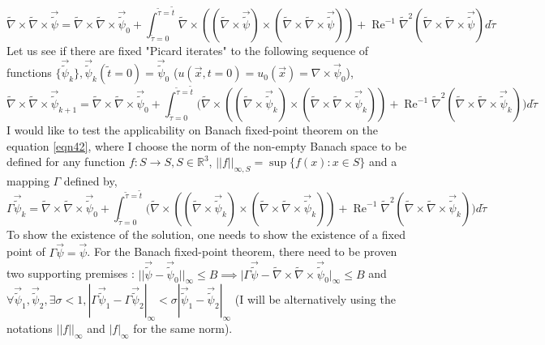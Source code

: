 \documentclass{article}
\begin{document}
\begin{equation*}
\tilde{\nabla}\times\tilde{\nabla}\times\vec{\tilde{\psi}} = \tilde{\nabla}\times\tilde{\nabla}\times\vec{\tilde{\psi}}_0 + \int_{\tilde{\tau} = 0}^{\tilde{\tau} = \tilde{t}} \tilde{\nabla} \times ((\tilde{\nabla} \times \vec{\tilde{\psi}})\times(\tilde{\nabla} \times \tilde{\nabla} \times \vec{\tilde{\psi}})) + \operatorname{Re}^{-1} \tilde{\nabla}^2(\tilde{\nabla}\times\tilde{\nabla}\times\vec{\tilde{\psi}}) d\tilde{\tau}
\end{equation*}
Let us see if there are fixed "Picard iterates" to the following sequence of functions $\{\vec{\tilde{\psi}}_k\}, \vec{\tilde{\psi}}_k(\tilde{t} = 0) = \vec{\tilde{\psi}}_0$ ($u(\vec{x},t=0) = u_0(\vec{x}) = \nabla \times \vec{\psi}_0$),
\begin{equation} \label{eqn42}
\tilde{\nabla}\times\tilde{\nabla}\times\vec{\tilde{\psi}}_{k+1} = \tilde{\nabla}\times\tilde{\nabla}\times\vec{\tilde{\psi}}_0 + \int_{\tilde{\tau} = 0}^{\tilde{\tau} = \tilde{t}} \bigg(\tilde{\nabla} \times ((\tilde{\nabla} \times \vec{\tilde{\psi}}_k)\times(\tilde{\nabla} \times \tilde{\nabla} \times \vec{\tilde{\psi}}_k)) + \operatorname{Re}^{-1} \tilde{\nabla}^2(\tilde{\nabla}\times\tilde{\nabla}\times\vec{\tilde{\psi}}_k) \bigg)d\tilde{\tau}
\end{equation}
I would like to test the applicability on Banach fixed-point theorem on the equation \ref{eqn42}, where I choose the norm of the non-empty Banach space to be defined for any function $f : S \to S, S \in \mathbb{R}^3$, $||f||_{\infty, S} = \sup\{f(x): x \in S\}$ and a mapping $\Gamma$ defined by,
\begin{equation*}
\Gamma \vec{\tilde{\psi}}_{k} = \tilde{\nabla}\times\tilde{\nabla}\times\vec{\tilde{\psi}}_0 + \int_{\tilde{\tau} = 0}^{\tilde{\tau} = \tilde{t}} \bigg(\tilde{\nabla} \times ((\tilde{\nabla} \times \vec{\tilde{\psi}}_k)\times(\tilde{\nabla} \times \tilde{\nabla} \times \vec{\tilde{\psi}}_k)) + \operatorname{Re}^{-1} \tilde{\nabla}^2(\tilde{\nabla}\times\tilde{\nabla}\times\vec{\tilde{\psi}}_k) \bigg)d\tilde{\tau}
\end{equation*}
To show the existence of the solution, one needs to show the existence of a fixed point of $\Gamma \vec{\psi} = \vec{\psi}$. For the Banach fixed-point theorem, there need to be proven two supporting premises : $||\vec{\tilde{\psi}}-\vec{\tilde{\psi}}_0||_{\infty}\le B \implies \bigg|\Gamma \vec{\tilde{\psi}} - \tilde{\nabla}\times\tilde{\nabla}\times\vec{\tilde{\psi}}_0\bigg|_{\infty}\le B$ and $\forall \vec{\tilde{\psi}}_1, \vec{\tilde{\psi}}_2, \exists \sigma < 1, |\Gamma\vec{\tilde{\psi}}_1 - \Gamma\vec{\tilde{\psi}}_2|_{\infty} < \sigma |\vec{\tilde{\psi}}_1 - \vec{\tilde{\psi}}_2|_{\infty}$ (I will be alternatively using the notations $||f||_{\infty}$ and $|f|_{\infty}$ for the same norm).
\end{document}
